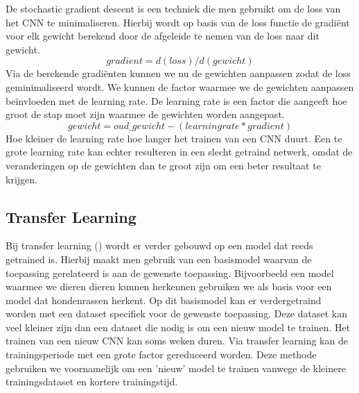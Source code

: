 De stochastic gradient descent is een techniek die men gebruikt om de loss van het CNN te minimaliseren.
Hierbij wordt op basis van de loss functie de gradi\"ent voor elk gewicht berekend door de afgeleide te nemen van de loss naar dit gewicht.
\begin{equation}
	gradient = d(loss)/d(gewicht)
\end{equation}
Via de berekende gradi\"enten kunnen we nu de gewichten aanpassen zodat de loss geminimaliseerd wordt.
We kunnen de factor waarmee we de gewichten aanpassen be\"invloeden met de learning rate.
De learning rate is een factor die aangeeft hoe groot de stap moet zijn waarmee de gewichten worden aangepast.
\begin{equation}
	gewicht = oud\_gewicht - (learning rate * gradient)
\end{equation}
Hoe kleiner de learning rate hoe langer het trainen van een CNN duurt.
Een te grote learning rate kan echter resulteren in een slecht getraind netwerk, omdat de veranderingen op de gewichten dan te groot zijn om een beter resultaat te krijgen.

\subsection{Transfer Learning}
Bij transfer learning (\cite{Geiger_IJRR_2013}) wordt er verder gebouwd op een model dat reeds getrained is.
Hierbij maakt men gebruik van een basismodel waarvan de toepassing gerelateerd is aan de gewenste toepassing.
Bijvoorbeeld een model waarmee we dieren dieren kunnen herkennen gebruiken we als basis voor een model dat hondenrassen herkent.
Op dit basismodel kan er verdergetraind worden met een dataset specifiek voor de gewenste toepassing.
Deze dataset kan veel kleiner zijn dan een dataset die nodig is om een nieuw model te trainen.
Het trainen van een nieuw CNN kan soms weken duren.
Via transfer learning kan de trainingsperiode met een grote factor gereduceerd worden.
Deze methode gebruiken we voornamelijk om een 'nieuw' model te trainen vanwege de kleinere trainingsdataset en kortere trainingstijd.


